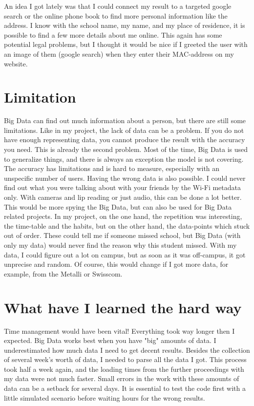 \documentclass[paper=a4, fontsize=11pt]{article}
\begin{document}
An idea I got lately was that I could connect my result to a targeted google search or the online phone book to find more personal information like the address. I know with the school name, my name, and my place of residence, it is possible to find a few more details about me online. This again has some potential legal problems, but I thought it would be nice if I greeted the user with an image of them (google search) when they enter their MAC-address on my website.



\section{Limitation}
Big Data can find out much information about a person, but there are still some limitations. Like in my project, the lack of data can be a problem. If you do not have enough representing data, you cannot produce the result with the accuracy you need. This is already the second problem. Most of the time, Big Data is used to generalize things, and there is always an exception the model is not covering. The accuracy has limitations and is hard to measure, especially with an unspecific number of users. Having the wrong data is also possible. I could never find out what you were talking about with your friends by the Wi-Fi metadata only. With cameras and lip reading or just audio, this can be done a lot better. This would be more spying the Big Data, but can also be used for Big Data related projects. In my project, on the one hand, the repetition was interesting, the time-table and the habits, but on the other hand, the data-points which stuck out of order. These could tell me if someone missed school, but Big Data (with only my data) would never find the reason why this student missed. With my data, I could figure out a lot on campus, but as soon as it was off-campus, it got unprecise and random. Of course, this would change if I got more data, for example, from the Metalli or Swisscom.

\section{What have I learned the hard way}
Time management would have been vital! Everything took way longer then I expected. Big Data works best when you have "big" amounts of data. I underestimated how much data I need to get decent results. Besides the collection of several week's worth of data, I needed to parse all the data I got. This process took half a week again, and the loading times from the further proceedings with my data were not much faster. Small errors in the work with these amounts of data can be a setback for several days. It is essential to test the code first with a little simulated scenario before waiting hours for the wrong results.
\end{document}
